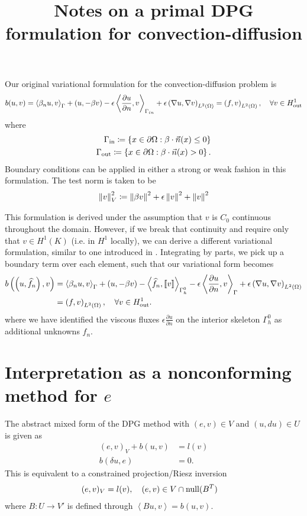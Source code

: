 \documentclass[final,leqno]{siamltex}
\title{Notes on a primal DPG formulation for convection-diffusion}
\newcommand{\nor}[1]{\left\| #1 \right\|}
\newcommand{\LRp}[1]{\left( #1 \right)}
\newcommand{\LRs}[1]{\left[ #1 \right]}
\newcommand{\LRa}[1]{\left\langle #1 \right\rangle}
\newcommand{\LRc}[1]{\left\{ #1 \right\}}
\newcommand{\Grad} {\ensuremath{\nabla}}
\newcommand{\jump}[1] {\ensuremath{\LRs{\!\left[#1\right]\!}}}
\newcommand{\fnh}{\widehat{f}_n}
\renewcommand{\L}{L^2\LRp{\Omega}}
\newcommand{\Gh}{\Gamma_h}
\let\grad\relax
\newcommand{\grad}{\nabla}
\newcommand{\pd}[2]{\frac{\partial#1}{\partial#2}}
\newcommand{\Gin} {\Gamma_{in}}
\newcommand{\outsub}{{\rm out}}
\begin{document}
\maketitle

Our original variational formulation for the convection-diffusion problem is 
\[
b(u,v) = \LRa{\beta_n u,v}_{\Gamma} + \LRp{u,-\beta \grad v} - \epsilon \LRa{\pd{u}{n},v}_{\Gin} + \epsilon\LRp{\Grad u, \Grad v}_{\L} = \LRp{f,v}_{\L} , \quad \forall v \in H^1_\outsub
\]
where 
\begin{align*}
\Gamma_{\rm in}\coloneqq \LRc{x\in \partial \Omega: \beta\cdot\vec{n}(x) \leq 0}\\
\Gamma_{\rm out}\coloneqq \LRc{x\in \partial \Omega: \beta\cdot\vec{n}(x) > 0}.
\end{align*}
Boundary conditions can be applied in either a strong or weak fashion in this formulation.  The test norm is taken to be 
\[
\nor{v}^2_V \coloneqq \nor{\beta\grad v}^2 + \epsilon\nor{\grad v}^2 + \nor{v}^2
\]

This formulation is derived under the assumption that $v$ is $C_0$ continuous throughout the domain.  However, if we break that continuity and require only that $v\in H^1(K)$ (i.e. in $H^1$ locally), we can derive a different variational formulation, similar to one introduced in \cite{primalDPG}.  Integrating by parts, we pick up a boundary term over each element, such that our variational form becomes
\begin{align*}
b\LRp{\LRp{u,\fnh},v} &= \LRa{\beta_n u,v}_{\Gamma} + \LRp{u,-\beta \grad v} - \LRa{\fnh,\jump{v}}_{\Gh^0} - \epsilon \LRa{\pd{u}{n},v}_{\Gamma} + \epsilon\LRp{\Grad u, \Grad v}_{\L} \\
&= \LRp{f,v}_{\L} , \quad \forall v \in H^1_\outsub.
\end{align*}
where we have identified the viscous fluxes $\epsilon\pd{u}{n}$ on the interior skeleton $\Gh^0$ as additional unknowns $\fnh$.  

\section{Interpretation as a nonconforming method for $e$}

The abstract mixed form of the DPG method with $(e,v)\in V$ and $(u,du)\in U$ is given as
\begin{align*}
(e,v)_V + b(u,v) &= l(v)\\
b(\delta u,e) &= 0.
\end{align*}
This is equivalent to a constrained projection/Riesz inversion 
\begin{align*}
(e,v)_V &= l(v), \quad (e,v) \in V\cap{\rm null}(B^T)
\end{align*}
where $B: U\rightarrow V'$ is defined through $\LRa{Bu,v} = b(u,v)$.  
\end{document}
